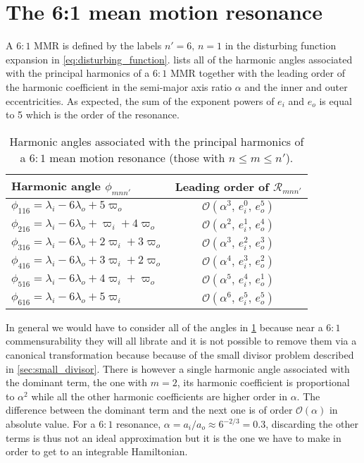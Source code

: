 \documentclass[ twoside,openright,titlepage,numbers=noenddot,headinclude,%
                footinclude=true,cleardoublepage=empty,abstractoff, %
                BCOR=5mm,paper=a4,fontsize=11pt,%
                american,%
                ]{scrreprt}
\begin{document}
\section{The 6:1 mean motion resonance}
\label{sec:6_by_1_resonance}
A $6:1$ MMR is defined by the labels $n'=6,\,n=1$ in the disturbing
function expansion in \cref{eq:disturbing_function}. 
lists all of the harmonic angles associated with the principal
harmonics of a $6:1$ MMR together with the leading order of the
harmonic coefficient in the semi-major axis ratio $\alpha$ and
the inner and outer eccentricities. As expected, the sum of the
exponent powers of $e_i$ and $e_o$ is equal to 5 which is the order
of the resonance.
\begin{table}[h!]
\centering
\begin{tabular}{l c}
\toprule
    Harmonic angle $\phi_{mnn'}$ & Leading order of $\mathcal{R}_{mnn'}$\\
\midrule
    $\phi_{116}=\lambda_i-6\lambda_o+5\varpi_o$ & 
    $\mathcal{O}(\alpha^3,\,e_i^0,\,e_o^5)$\\
$\phi_{216}=\lambda_i-6\lambda_o+\varpi_i + 4\varpi_o$ & 
    $\mathcal{O}(\alpha^2,\,e_i^1,\,e_o^4)$\\
$\phi_{316}=\lambda_i-6\lambda_o+2\varpi_i + 3\varpi_o$ & 
    $\mathcal{O}(\alpha^3,\,e_i^2,\,e_o^3)$\\
$\phi_{416}=\lambda_i-6\lambda_o+3\varpi_i + 2\varpi_o$ & 
    $\mathcal{O}(\alpha^4,\,e_i^3,\,e_o^2)$\\
$\phi_{516}=\lambda_i-6\lambda_o+4\varpi_i + \varpi_o$ & 
    $\mathcal{O}(\alpha^5,\,e_i^4,\,e_o^1)$\\
$\phi_{616}=\lambda_i-6\lambda_o+5\varpi_i  $ & 
    $\mathcal{O}(\alpha^6,\,e_i^5,\,e_o^5)$\\
\bottomrule
\end{tabular}
\caption{Harmonic angles associated with the principal harmonics
    of a $6:1$ mean motion resonance (those with $n\leq m\leq n'$).}
\label{tab:6_1_angles}
\end{table}

In general we would have to consider all of the angles in \cref{tab:6_1_angles}
because near a $6:1$ commensurability they will all librate and it is not possible
to remove them via a canonical transformation because because of the small
divisor problem described in \cref{sec:small_divisor}.
There is however a single harmonic angle associated with the dominant term, the one with 
$m=2$, its harmonic coefficient is proportional to $\alpha^2$
while all the other harmonic coefficients
are higher order in $\alpha$. The difference between the dominant term and the 
next one is of order $\mathcal{O}(\alpha)$ in absolute value. For a $6:1$ resonance, 
$\alpha=a_i/a_o\approx 6^{-2/3}=0.3$, discarding the other terms is thus
not an ideal approximation but it is the one we have to make in order to get to 
an integrable Hamiltonian. 
\end{document}
